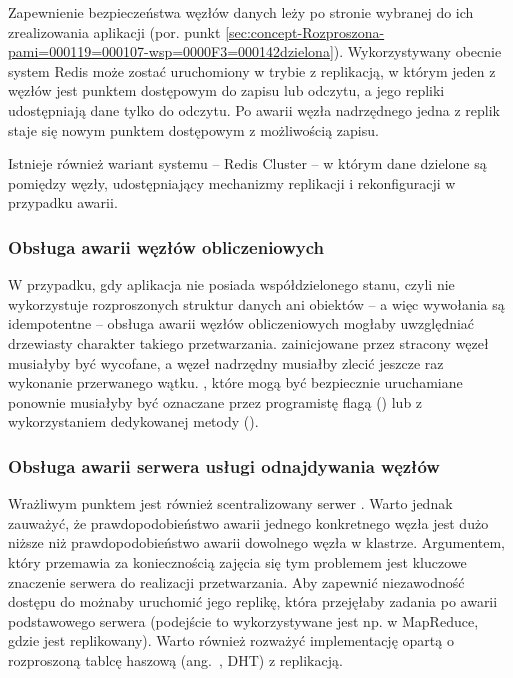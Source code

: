 Zapewnienie bezpieczeństwa węzłów danych leży po stronie wybranej
do ich zrealizowania aplikacji (por. punkt \ref{sec:concept-Rozproszona-pami=000119=000107-wsp=0000F3=000142dzielona}).
Wykorzystywany obecnie system Redis może zostać uruchomiony w trybie
z replikacją, w którym jeden z węzłów jest punktem dostępowym do zapisu
lub odczytu, a jego repliki udostępniają dane tylko do odczytu. Po
awarii węzła nadrzędnego jedna z replik staje się nowym punktem dostępowym
z możliwością zapisu.

Istnieje również wariant systemu -- Redis Cluster -- w którym dane
dzielone są pomiędzy węzły, udostępniający mechanizmy replikacji i
rekonfiguracji w przypadku awarii.


\subsubsection*{Obsługa awarii węzłów obliczeniowych}

W przypadku, gdy aplikacja nie posiada współdzielonego stanu, czyli
nie wykorzystuje rozproszonych struktur danych ani obiektów -- a więc
wywołania są idempotentne -- obsługa awarii węzłów obliczeniowych
mogłaby uwzględniać drzewiasty charakter takiego przetwarzania. 
zainicjowane przez stracony węzeł musiałyby być wycofane, a węzeł
nadrzędny musiałby zlecić jeszcze raz wykonanie przerwanego wątku.
, które mogą być bezpiecznie uruchamiane
ponownie musiałyby być  oznaczane przez programistę
flagą () lub z wykorzystaniem dedykowanej metody
(). 


\subsubsection*{Obsługa awarii serwera usługi odnajdywania węzłów}

Wrażliwym punktem jest również scentralizowany serwer .
Warto jednak zauważyć, że prawdopodobieństwo awarii jednego konkretnego
węzła jest dużo niższe niż prawdopodobieństwo awarii dowolnego węzła
w klastrze. Argumentem, który przemawia za koniecznością zajęcia się
tym problemem jest kluczowe znaczenie serwera 
do realizacji przetwarzania. Aby zapewnić niezawodność dostępu do
 możnaby uruchomić jego replikę,
która przejęłaby zadania po awarii podstawowego serwera (podejście
to wykorzystywane jest np. w MapReduce, gdzie 
jest replikowany). Warto również rozważyć implementację opartą o rozproszoną
tablcę haszową (ang.~, DHT) z replikacją.



